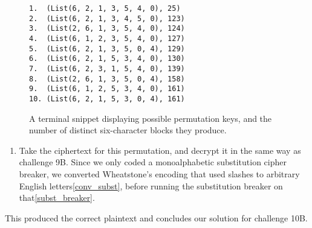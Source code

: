 \begin{figure}[H]
\centering
\begin{minipage}{38ex}
    \begin{verbatim}
1.  (List(6, 2, 1, 3, 5, 4, 0), 25) 
2.  (List(6, 2, 1, 3, 4, 5, 0), 123)
3.  (List(2, 6, 1, 3, 5, 4, 0), 124)
4.  (List(6, 1, 2, 3, 5, 4, 0), 127)
5.  (List(6, 2, 1, 3, 5, 0, 4), 129)
6.  (List(6, 2, 1, 5, 3, 4, 0), 130)
7.  (List(6, 2, 3, 1, 5, 4, 0), 139)
8.  (List(2, 6, 1, 3, 5, 0, 4), 158)
9.  (List(6, 1, 2, 5, 3, 4, 0), 161)
10. (List(6, 2, 1, 5, 3, 0, 4), 161)
    \end{verbatim}
\end{minipage}
\caption{A terminal snippet displaying possible permutation keys, and the number of distinct six-character blocks they produce.}
\label{lst:terminalkeys}
\end{figure}

\begin{enumerate}[resume]
    \item Take the ciphertext for this permutation, and decrypt it in the same way as challenge 9B. Since we only coded a monoalphabetic substitution cipher breaker, we converted Wheatstone's encoding that used slashes to arbitrary English letters\cref{conv_subst}, before running the substitution breaker on that\cref{subst_breaker}.
\end{enumerate}

This produced the correct plaintext and concludes our solution for challenge 10B.